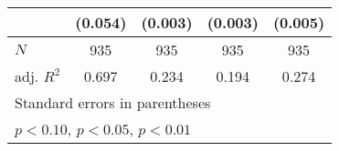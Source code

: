 {\begin{tabular}{l*{4}{c}}
            &     (0.054)         &     (0.003)         &     (0.003)         &     (0.005)         \\
\hline
\(N\)       &         935         &         935         &         935         &         935         \\
adj. \(R^{2}\)&       0.697         &       0.234         &       0.194         &       0.274         \\
\hline\hline
\multicolumn{5}{l}{\footnotesize Standard errors in parentheses}\\
\multicolumn{5}{l}{\footnotesize \sym{*} \(p<0.10\), \sym{**} \(p<0.05\), \sym{***} \(p<0.01\)}\\
\end{tabular}
}
